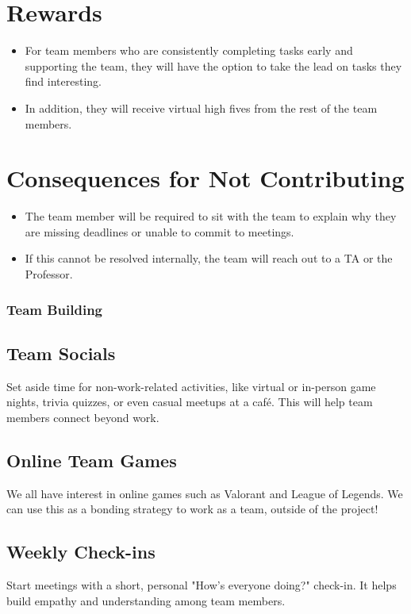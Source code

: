 \documentclass{article}
\begin{document}
\section*{Rewards}

\begin{itemize}
    \item For team members who are consistently completing tasks early and supporting the team, they will have the option to take the lead on tasks they find interesting.
    \item In addition, they will receive virtual high fives from the rest of the team members.
\end{itemize}

\section*{Consequences for Not Contributing}

\begin{itemize}
    \item The team member will be required to sit with the team to explain why they are missing deadlines or unable to commit to meetings.
    \item If this cannot be resolved internally, the team will reach out to a TA or the Professor.
\end{itemize}
\subsubsection*{Team Building}

\subsection*{Team Socials}
Set aside time for non-work-related activities, like virtual or in-person game nights, trivia quizzes, or even casual meetups at a café. This will help team members connect beyond work.

\subsection*{Online Team Games}
We all have interest in online games such as Valorant and League of Legends. We can use this as a bonding strategy to work as a team, outside of the project!

\subsection*{Weekly Check-ins}
Start meetings with a short, personal "How’s everyone doing?" check-in. It helps build empathy and understanding among team members.
\end{document}
